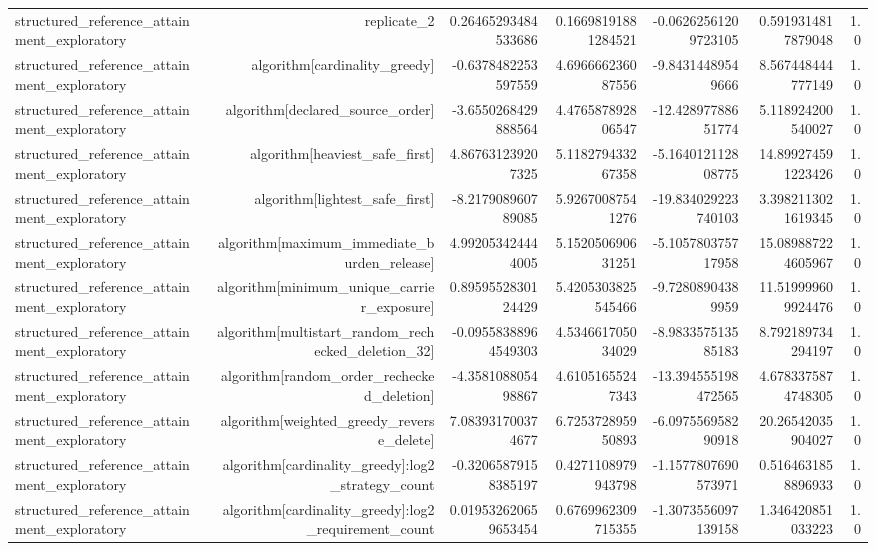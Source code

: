 {\begin{longtable}{lrrrrrr}
structured\_reference\_attainment\_exploratory & replicate\_2 & 0.26465293484533686 & 0.16698191881284521 & -0.06262561209723105 & 0.5919314817879048 & 1.0 \\
structured\_reference\_attainment\_exploratory & algorithm[cardinality\_greedy] & -0.6378482253597559 & 4.696666236087556 & -9.84314489549666 & 8.567448444777149 & 1.0 \\
structured\_reference\_attainment\_exploratory & algorithm[declared\_source\_order] & -3.6550268429888564 & 4.476587892806547 & -12.42897788651774 & 5.118924200540027 & 1.0 \\
structured\_reference\_attainment\_exploratory & algorithm[heaviest\_safe\_first] & 4.867631239207325 & 5.118279433267358 & -5.164012112808775 & 14.899274591223426 & 1.0 \\
structured\_reference\_attainment\_exploratory & algorithm[lightest\_safe\_first] & -8.217908960789085 & 5.92670087541276 & -19.834029223740103 & 3.3982113021619345 & 1.0 \\
structured\_reference\_attainment\_exploratory & algorithm[maximum\_immediate\_burden\_release] & 4.992053424444005 & 5.152050690631251 & -5.105780375717958 & 15.089887224605967 & 1.0 \\
structured\_reference\_attainment\_exploratory & algorithm[minimum\_unique\_carrier\_exposure] & 0.8959552830124429 & 5.4205303825545466 & -9.72808904389959 & 11.519999609924476 & 1.0 \\
structured\_reference\_attainment\_exploratory & algorithm[multistart\_random\_rechecked\_deletion\_32] & -0.09558388964549303 & 4.534661705034029 & -8.983357513585183 & 8.792189734294197 & 1.0 \\
structured\_reference\_attainment\_exploratory & algorithm[random\_order\_rechecked\_deletion] & -4.358108805498867 & 4.61051655247343 & -13.394555198472565 & 4.6783375874748305 & 1.0 \\
structured\_reference\_attainment\_exploratory & algorithm[weighted\_greedy\_reverse\_delete] & 7.083931700374677 & 6.725372895950893 & -6.097556958290918 & 20.26542035904027 & 1.0 \\
structured\_reference\_attainment\_exploratory & algorithm[cardinality\_greedy]:log2\_strategy\_count & -0.32065879158385197 & 0.4271108979943798 & -1.1577807690573971 & 0.5164631858896933 & 1.0 \\
structured\_reference\_attainment\_exploratory & algorithm[cardinality\_greedy]:log2\_requirement\_count & 0.019532620659653454 & 0.6769962309715355 & -1.3073556097139158 & 1.346420851033223 & 1.0 \\

\end{longtable}}
